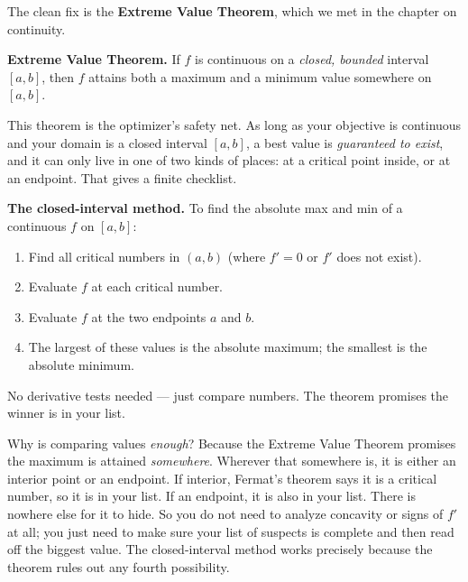 The clean fix is the \textbf{Extreme Value Theorem}, which we met in the chapter on
continuity.

\begin{focusbox}
\textbf{Extreme Value Theorem.} If $f$ is continuous on a \emph{closed, bounded}
interval $[a,b]$, then $f$ attains both a maximum and a minimum value somewhere on
$[a,b]$.
\end{focusbox}

This theorem is the optimizer's safety net. As long as your objective is continuous
and your domain is a closed interval $[a,b]$, a best value is \emph{guaranteed to
exist}, and it can only live in one of two kinds of places: at a critical point
inside, or at an endpoint. That gives a finite checklist.

\begin{focusbox}
\textbf{The closed-interval method.} To find the absolute max and min of a continuous
$f$ on $[a,b]$:
\begin{enumerate}
  \item Find all critical numbers in $(a,b)$ (where $f'=0$ or $f'$ does not exist).
  \item Evaluate $f$ at each critical number.
  \item Evaluate $f$ at the two endpoints $a$ and $b$.
  \item The largest of these values is the absolute maximum; the smallest is the
    absolute minimum.
\end{enumerate}
No derivative tests needed --- just compare numbers. The theorem promises the winner
is in your list.
\end{focusbox}

\begin{whybox}
Why is comparing values \emph{enough}? Because the Extreme Value Theorem promises the
maximum is attained \emph{somewhere}. Wherever that somewhere is, it is either an
interior point or an endpoint. If interior, Fermat's theorem says it is a critical
number, so it is in your list. If an endpoint, it is also in your list. There is
nowhere else for it to hide. So you do not need to analyze concavity or signs of
$f'$ at all; you just need to make sure your list of suspects is complete and then
read off the biggest value. The closed-interval method works precisely because the
theorem rules out any fourth possibility.
\end{whybox}

